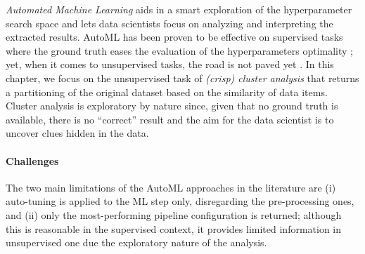 
\textit{Automated Machine Learning} aids in a smart exploration of the hyperparameter search space \cite{hutter2011sequential} and lets data scientists focus on analyzing and interpreting the extracted results.
AutoML has been proven to be effective on supervised tasks where the ground truth eases the evaluation of the hyperparameters optimality   \cite{thornton2013auto,FRANCIA2023182}; yet, when it comes to unsupervised tasks, the road is not paved yet \cite{barlow1989unsupervised}.
In this chapter, we focus on the unsupervised task of \textit{(crisp) cluster analysis} \cite{arthur2006k} that returns a partitioning of the original dataset based on the similarity of data items.
Cluster analysis is exploratory by nature since, given that no ground truth is available, there is no ``correct'' result \cite{no_correct_clustering,lensen2017using} and the aim for the data scientist is to uncover clues hidden in the data.
\paragraph{Challenges} The two main limitations of the AutoML approaches in the literature are (i) auto-tuning is applied to the ML step only, disregarding the pre-processing ones, and (ii) only the most-performing pipeline configuration is returned; although this is reasonable in the supervised context, it provides limited information in unsupervised one due the exploratory nature of the analysis.

